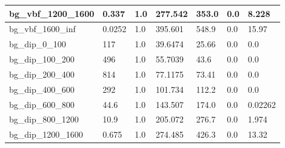 \documentclass[a4paper, 10pt]{article}
\begin{document}
\begin{table}[H]
\begin{center}
\begin{tabular}{|m{23.0mm}|m{23.0mm}|m{18.0mm}|m{19.0mm}|m{19.0mm}|m{19.0mm}|m{19.0mm}|}
      \hline
      {\cellcolor{white}         bg\_vbf\_1200\_1600}& {\cellcolor{white}         0.337}& {\cellcolor{white}         1.0}& {\cellcolor{white}         277.542}& {\cellcolor{white}         353.0}& {\cellcolor{orange}         0.0}& {\cellcolor{orange}         8.228}\\
      \hline
      {\cellcolor{white}         bg\_vbf\_1600\_inf}& {\cellcolor{white}         0.0252}& {\cellcolor{white}         1.0}& {\cellcolor{white}         395.601}& {\cellcolor{white}         548.9}& {\cellcolor{red}         0.0}& {\cellcolor{red}         15.97}\\
      \hline
      {\cellcolor{white}         bg\_dip\_0\_100}& {\cellcolor{white}         117}& {\cellcolor{white}         1.0}& {\cellcolor{white}         39.6474}& {\cellcolor{white}         25.66}& {\cellcolor{green}         0.0}& {\cellcolor{green}         0.0}\\
      \hline
      {\cellcolor{white}         bg\_dip\_100\_200}& {\cellcolor{white}         496}& {\cellcolor{white}         1.0}& {\cellcolor{white}         55.7039}& {\cellcolor{white}         43.6}& {\cellcolor{green}         0.0}& {\cellcolor{green}         0.0}\\
      \hline
      {\cellcolor{white}         bg\_dip\_200\_400}& {\cellcolor{white}         814}& {\cellcolor{white}         1.0}& {\cellcolor{white}         77.1175}& {\cellcolor{white}         73.41}& {\cellcolor{green}         0.0}& {\cellcolor{green}         0.0}\\
      \hline
      {\cellcolor{white}         bg\_dip\_400\_600}& {\cellcolor{white}         292}& {\cellcolor{white}         1.0}& {\cellcolor{white}         101.734}& {\cellcolor{white}         112.2}& {\cellcolor{green}         0.0}& {\cellcolor{green}         0.0}\\
      \hline
      {\cellcolor{white}         bg\_dip\_600\_800}& {\cellcolor{white}         44.6}& {\cellcolor{white}         1.0}& {\cellcolor{white}         143.507}& {\cellcolor{white}         174.0}& {\cellcolor{green}         0.0}& {\cellcolor{green}         0.02262}\\
      \hline
      {\cellcolor{white}         bg\_dip\_800\_1200}& {\cellcolor{white}         10.9}& {\cellcolor{white}         1.0}& {\cellcolor{white}         205.072}& {\cellcolor{white}         276.7}& {\cellcolor{green}         0.0}& {\cellcolor{green}         1.974}\\
      \hline
      {\cellcolor{white}         bg\_dip\_1200\_1600}& {\cellcolor{white}         0.675}& {\cellcolor{white}         1.0}& {\cellcolor{white}         274.485}& {\cellcolor{white}         426.3}& {\cellcolor{orange}         0.0}& {\cellcolor{orange}         13.32}\\

\end{tabular}
\end{center}
\end{table}
\end{document}
